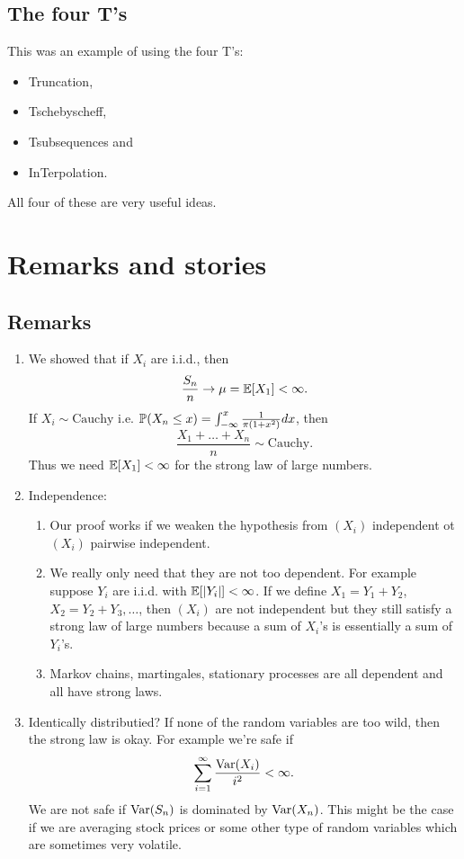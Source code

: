 \subsection{The four T's}
This was an example of using the four T's:
\begin{itemize}
    \item Truncation,
    \item Tschebyscheff,
    \item Tsubsequences and
    \item InTerpolation.
\end{itemize}
All four of these are very useful ideas.
\section{Remarks and stories}
\subsection{Remarks}
\begin{enumerate}
    \item We showed that if $X_i$ are i.i.d., then 
    \[ \frac{S_n}{n} \to \mu = {\mathbb{E}}[X_1] < \infty.\]
    If $X_i \sim \text{Cauchy}$ i.e. ${\mathbb{P}}(X_n \le x) = \int_{-\infty}^x \frac{1}{\pi(1+x^2)}dx$, then 
    \[ \frac{X_1+\ldots+X_n}{n} \sim \text{Cauchy}.\]
    Thus we need ${\mathbb{E}}[X_1]<\infty$ for the strong law of large numbers.
    \item Independence:
    \begin{enumerate}
        \item Our proof works if we weaken the hypothesis from $(X_i)$ independent ot $(X_i)$ pairwise independent.
        \item We really only need that they are not too dependent. For example suppose $Y_i$ are i.i.d. with ${\mathbb{E}}[{\left\lvert Y_i\right\rvert}]<\infty$. If we define $X_1 = Y_1+Y_2$, $X_2 = Y_2+Y_3, \ldots$, then $(X_i)$ are not independent but they still satisfy a strong law of large numbers because a sum of $X_i$'s is essentially a sum of $Y_i$'s.
        \item Markov chains, martingales, stationary processes are all dependent and all have strong laws.
    \end{enumerate}
    \item Identically distributied? If none of the random variables are too wild, then the strong law is okay. For example we're safe if 
    \[\sum_{i=1}^\infty \frac{\operatorname{Var}(X_i)}{i^2} < \infty.\]
    We are not safe if $\operatorname{Var}(S_n)$ is dominated by $\operatorname{Var}(X_n)$. This might be the case if we are averaging stock prices or some other type of random variables which are sometimes very volatile.  
\end{enumerate}
